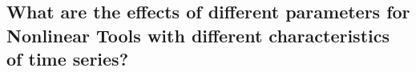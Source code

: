 %
%
%
%
%
%
%
%






\subsection{What are the effects 
	of different parameters for Nonlinear Tools 
	with different characteristics of time series?}




